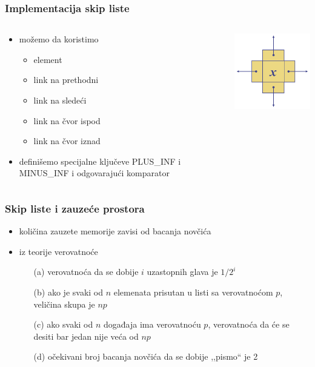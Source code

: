\documentclass[compress]{beamer}
\begin{document}
\begin{frame}[fragile]
  \frametitle{Implementacija skip liste}
  \begin{columns}
    \begin{column}[c]{6cm}
      \begin{itemize}
        \item možemo da koristimo 
        \begin{itemize}
          \item element
          \item link na prethodni
          \item link na sledeći
          \item link na čvor ispod
          \item link na čvor iznad
        \end{itemize}
        \item definišemo specijalne ključeve {\tiny PLUS\_INF} i {\tiny MINUS\_INF} i odgovarajući komparator 
      \end{itemize}
    \end{column}
    \begin{column}[c]{6cm}
      \begin{center}
        \includegraphics[width=5cm]{asp-10-pic15.png}
      \end{center}
    \end{column}
  \end{columns}
\end{frame}

\begin{frame}[fragile]
  \frametitle{Skip liste i zauzeće prostora}
  \begin{itemize}
    \item količina zauzete memorije zavisi od bacanja novčića
    \item iz teorije verovatnoće
    \begin{itemize}
      \item[(a)] verovatnoća da se dobije $i$ uzastopnih glava je $1/2^i$
      \item[(b)] ako je svaki od $n$ elemenata prisutan u listi sa verovatnoćom $p$, veličina skupa je $np$
      \item[(c)] ako svaki od $n$ događaja ima verovatnoću $p$, verovatnoća da će se desiti bar jedan nije veća od $np$
      \item[(d)] očekivani broj bacanja novčića da se dobije ,,pismo`` je 2
    \end{itemize}
  \end{itemize}
\end{frame}
\end{document}
